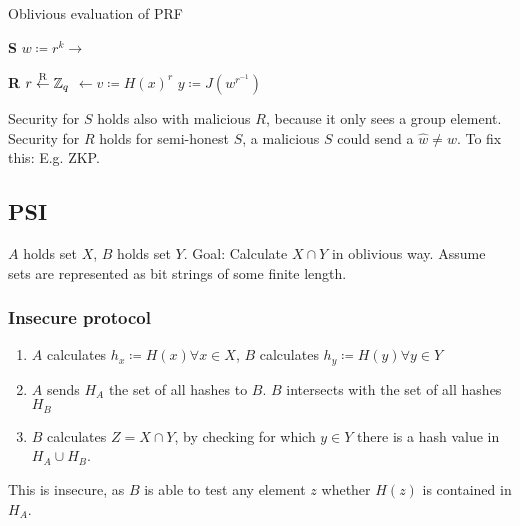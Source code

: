 \begin{algorithm}
		\caption{Oblivious evaluation of PRF}

		\begin{multicols}{2}
				\begin{algorithmic}[0]
						\State \textbf{S}
						\State
						\State
						\State $w \coloneqq r^k \rightarrow$
				\end{algorithmic}

				\columnbreak

				\begin{algorithmic}[0]
						\State \textbf{R}
						\State $r \overset{\mathrm{R}}{\gets} \mathbb{Z}_q$
						\State $\leftarrow v \coloneqq H(x)^r$ 
						\State
						\State $y \coloneqq J(w^{r^{-1}})$
				\end{algorithmic}
		\end{multicols}
\end{algorithm}

Security for $S$ holds also with malicious $R$, because it only sees a group
element. Security for $R$ holds for semi-honest $S$, a malicious $S$ could send
a $\hat{w} \neq w$. To fix this: E.g. ZKP.

\subsection{PSI}

$A$ holds set $X$, $B$ holds set $Y$. Goal: Calculate $X \cap Y$ in oblivious
way. Assume sets are represented as bit strings of some finite length.

\subsubsection{Insecure protocol}

\begin{enumerate}
		\item $A$ calculates $h_x \coloneqq H(x) \forall x \in X$, $B$
				calculates $h_y \coloneqq H(y) \forall y \in Y$
		\item $A$ sends $H_A$ the set of all hashes to $B$. $B$ intersects with
				the set of all hashes $H_B$
		\item $B$ calculates $Z = X \cap Y$, by checking for which $y \in Y$
				there is a hash value in $H_A \cup H_B$.
\end{enumerate}

This is insecure, as $B$ is able to test any element $z$ whether $H(z)$ is
contained in $H_A$.

